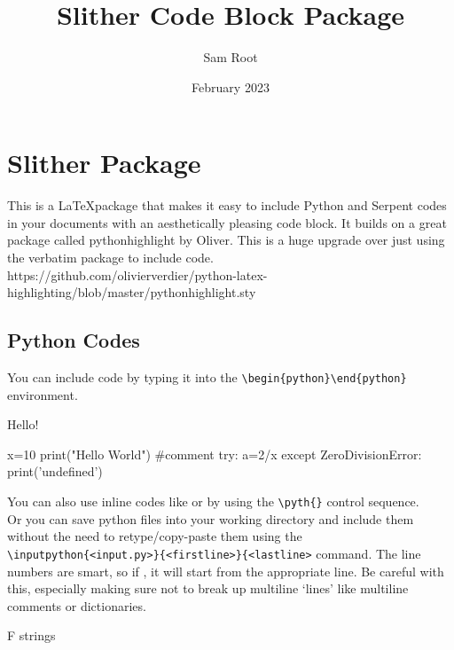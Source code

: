 \documentclass{article}
\title{Slither Code Block Package}
\author{Sam Root}
\date{February 2023}
\begin{document}
\section*{Slither Package}
This is a \LaTeX package that makes it easy to include Python and Serpent  codes in your documents with an aesthetically pleasing code block. It builds on a great package called pythonhighlight by Oliver. This is a huge upgrade over just using the verbatim package to include code. \\

https://github.com/olivierverdier/python-latex-highlighting/blob/master/pythonhighlight.sty


\subsection*{Python Codes}
You can include code by typing it into the \verb|\begin{python}\end{python}| environment.

\begin{code}\caption{Hello!} \begin{python}
    x=10
    print("Hello World") #comment
    try:
        a=2/x
    except ZeroDivisionError:
        print('undefined')
\end{python}\label{code:hello}\end{code}

You can also use inline codes like  or  by using the \verb|\pyth{}| control sequence. \\

Or you can save python files into your working directory and include them without the need to retype/copy-paste them using the \\ \verb|\inputpython{<input.py>}{<firstline>}{<lastline>| command. The line numbers are smart, so if , it will start from the appropriate line. Be careful with this, especially making sure not to break up multiline `lines' like multiline comments or dictionaries. 

\begin{code}\caption{F strings}
\label{code:fstrings}\end{code}

\newpage
\end{document}
